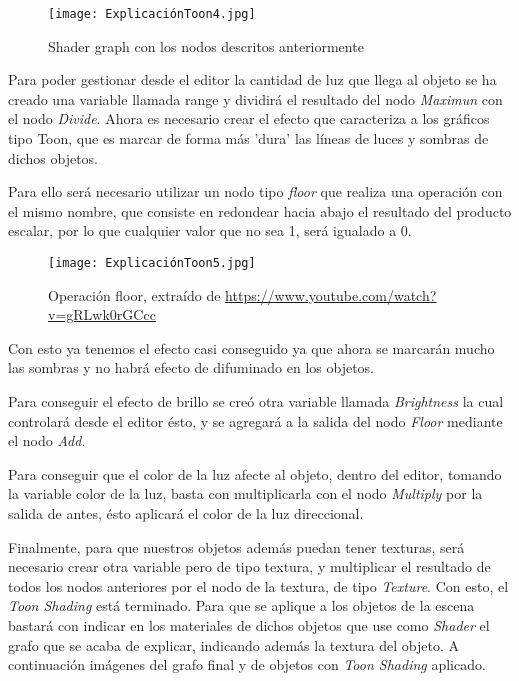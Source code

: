 \begin{figure}[H]
    \centering
    \texttt{[image: ExplicaciónToon4.jpg]}
    \caption{Shader graph con los nodos descritos anteriormente}
\end{figure}

Para poder gestionar desde el editor la cantidad de luz que llega al objeto se ha creado una variable llamada range y dividirá el resultado del nodo \textit{Maximun} con el nodo \textit{Divide}. Ahora es necesario crear el efecto que caracteriza a los gráficos tipo Toon, que es marcar de forma más 'dura' las líneas de luces y sombras de dichos objetos.

Para ello será necesario utilizar un nodo tipo \textit{floor} que realiza una operación con el mismo nombre, que consiste en redondear hacia abajo el resultado del producto escalar, por lo que cualquier valor que no sea 1, será igualado a 0. 

\begin{figure}[H]
    \centering
    \texttt{[image: ExplicaciónToon5.jpg]}
    \caption{Operación floor, extraído de \url{https://www.youtube.com/watch?v=gRLwk0rGCcc}}
\end{figure}

Con esto ya tenemos el efecto casi conseguido ya que ahora se marcarán mucho las sombras y no habrá efecto de difuminado en los objetos.

Para conseguir el efecto de brillo se creó otra variable llamada \textit{Brightness} la cual controlará desde el editor ésto, y se agregará a la salida del nodo \textit{Floor} mediante el nodo \textit{Add}. 

Para conseguir que el color de la luz afecte al objeto, dentro del editor, tomando la variable color de la luz, basta con multiplicarla con el nodo \textit{Multiply} por la salida de antes, ésto aplicará el color de la luz direccional.

Finalmente, para que nuestros objetos además puedan tener texturas, será necesario crear otra variable pero de tipo textura, y multiplicar el resultado de todos los nodos anteriores por el nodo de la textura, de tipo \textit{Texture}. Con esto, el \textit{Toon Shading} está terminado. Para que se aplique a los objetos de la escena bastará con indicar en los materiales de dichos objetos que use como \textit{Shader} el grafo que se acaba de explicar, indicando además la textura del objeto. A continuación imágenes del grafo final y de objetos con \textit{Toon Shading} aplicado.


